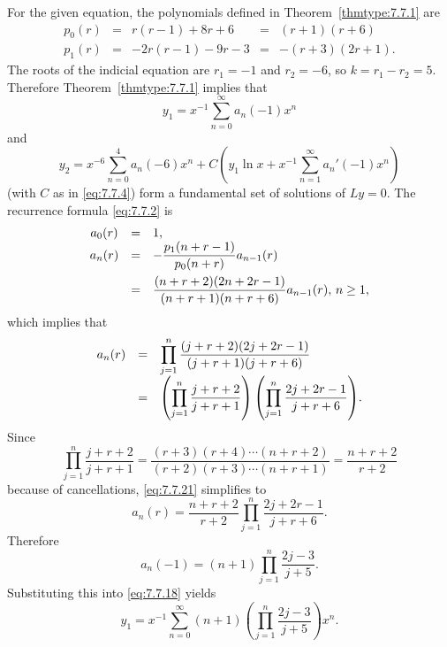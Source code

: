 \begin{examplesolution}
\solution For the given equation, the polynomials defined in Theorem~\ref{thmtype:7.7.1} are
\[
  \begin{array}{ccccc}
    p_{0}(r) & = & r(r-1)+8r+6   & = & (r+1)(r+6)    \\[5pt]
    p_{1}(r) & = & -2r(r-1)-9r-3 & = & -(r+3)(2r+1).
  \end{array}
\]
The roots of the indicial equation are $r_{1}=-1$ and $r_{2}=-6$, so $k=r_{1}-r_{2}=5$. Therefore
Theorem~\ref{thmtype:7.7.1} implies that
\begin{equation}
  \label{eq:7.7.18}y_{1}=x^{-1}\sum_{n=0}^{\infty}a_{n}(-1)x^{n}
\end{equation}
and
\begin{equation}
  \label{eq:7.7.19}y_{2}=x^{-6}\sum_{n=0}^{4}a_{n}(-6)x^{n}+C\left(y_{1}\ln x+x^{-1}\sum_{n=1}^{\infty}a_{n}'(-1)x^{n}\right)
\end{equation}
(with $C$ as in \eqref{eq:7.7.4}) form a fundamental set of solutions of $Ly=0$. The recurrence
formula \eqref{eq:7.7.2} is
\begin{equation}
  \label{eq:7.7.20}
  \begin{array}{ccl}
    a_{0}(r) & = & 1,                                                             \\
    a_{n}(r) & = & -\displaystyle\frac{p_{1}(n+r-1)}{p_{0}(n+r)}a_{n-1}(r)                 \\[10pt]
             & = & \displaystyle\frac{(n+r+2)(2n+2r-1)}{(n+r+1)(n+r+6)}a_{n-1}(r),\,n\ge1,
  \end{array}
\end{equation}
which implies that
\begin{equation}
  \label{eq:7.7.21}
  \begin{array}{ccl}
    a_{n}(r) & = & \displaystyle{\prod_{j=1}^{n}\frac{(j+r+2)(2j+2r-1)}{(j+r+1)(j+r+6)}}                                             \\[10pt]
             & = & \displaystyle{\left(\prod_{j=1}^{n}\frac{j+r+2}{j+r+1}\right) \left(\prod_{j=1}^{n}\frac{2j+2r-1}{j+r+6}\right)}.
  \end{array}
\end{equation}
Since
\[
  \prod_{j=1}^{n}\frac{j+r+2}{j+r+1}=\frac{(r+3)(r+4)\cdots(n+r+2)}{(r+2)(r+3)\cdots(n+r+1)}=\frac{n+r+2}{r+2}
\]
because of cancellations, \eqref{eq:7.7.21} simplifies to
\[
  a_{n}(r)=\frac{n+r+2}{r+2}\prod_{j=1}^{n}\frac{2j+2r-1}{j+r+6}.
\]
Therefore
\[
  a_{n}(-1)=(n+1)\prod_{j=1}^{n}\frac{2j-3}{j+5}.
\]
Substituting this into \eqref{eq:7.7.18} yields
\[
  y_{1}=x^{-1}\sum_{n=0}^{\infty}(n+1)\left(\prod_{j=1}^{n}\frac{2j-3}{j+5}\right)x^{n}.
\]


\end{examplesolution}
